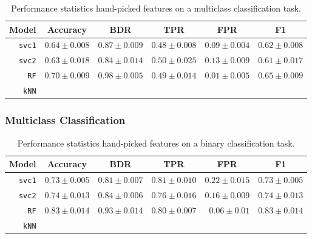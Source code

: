 \begin{table}[ht]
  \centering
  \begin{tabular}{ r  r  r  r  r  r } \hline
    \multicolumn{1}{c}{\textbf{Model}} & \multicolumn{1}{c}{\textbf{Accuracy}} & \multicolumn{1}{c}{\textbf{BDR}} & \multicolumn{1}{c}{\textbf{TPR}} &
      \multicolumn{1}{c}{\textbf{FPR}} & \multicolumn{1}{c}{\textbf{F1}} \\ \hline

    \texttt{svc1} & $0.64 \pm 0.008$ & $0.87 \pm 0.009$ & $0.48 \pm 0.008$ & $0.09 \pm 0.004$ & $0.62 \pm 0.008$ \\

    \texttt{svc2} & $0.63 \pm 0.018$ & $0.84 \pm 0.014$ & $0.50 \pm 0.025$ & $0.13 \pm 0.009$ & $0.61 \pm 0.017$ \\

    \texttt{RF} & $0.70 \pm 0.009$ & $0.98 \pm 0.005$ & $0.49 \pm 0.014$ & $0.01 \pm 0.005$ & $0.65 \pm 0.009$ \\

    \texttt{kNN} & & & & & \\

    \hline
  \end{tabular}
  \caption{Performance statistics hand-picked features on a multiclass classification task.}
\end{table}

\subsubsection{Multiclass Classification}


\begin{table}[ht]
  \centering
  \begin{tabular}{ r  r  r  r  r  r } \hline
    \multicolumn{1}{c}{\textbf{Model}} & \multicolumn{1}{c}{\textbf{Accuracy}} & \multicolumn{1}{c}{\textbf{BDR}} & \multicolumn{1}{c}{\textbf{TPR}} &
      \multicolumn{1}{c}{\textbf{FPR}} & \multicolumn{1}{c}{\textbf{F1}} \\ \hline

    \texttt{svc1} & $0.73 \pm 0.005$ & $0.81 \pm 0.007$ & $0.81 \pm 0.010$ & $0.22 \pm 0.015$ & $0.73 \pm 0.005$ \\

    \texttt{svc2} & $0.74 \pm 0.013$ & $0.84 \pm 0.006$ & $0.76 \pm 0.016$ & $0.16 \pm 0.009$ & $0.74 \pm 0.013$ \\

    \texttt{RF} & $0.83 \pm 0.014$ & $0.93 \pm 0.014$ & $0.80 \pm 0.007$ & $0.06 \pm 0.01$ & $0.83 \pm 0.014$\\

    \texttt{kNN} & & & & & \\

    \hline
  \end{tabular}
  \caption{Performance statistics hand-picked features on a binary classification task.}
\end{table}

